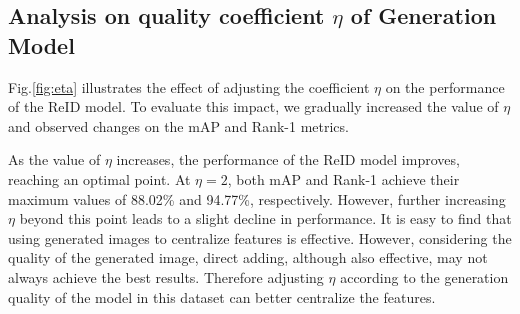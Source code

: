 




\subsection{Analysis on quality coefficient $\eta$ of Generation Model}

Fig.\ref{fig:eta} illustrates the effect of adjusting the coefficient $\eta$ on the performance of the ReID model. To evaluate this impact, we gradually increased the value of $\eta$ and observed changes on the mAP and Rank-1 metrics. 

As the value of $\eta$ increases, the performance of the ReID model improves, reaching an optimal point. At $\eta = 2$, both mAP and Rank-1 achieve their maximum values of 88.02\% and 94.77\%, respectively. However, further increasing $\eta$ beyond this point leads to a slight decline in performance. It is easy to find that using generated images to centralize features is effective. However, considering the quality of the generated image, direct adding, although also effective, may not always achieve the best results. Therefore adjusting $\eta$ according to the generation quality of the model in this dataset can better centralize the features.


